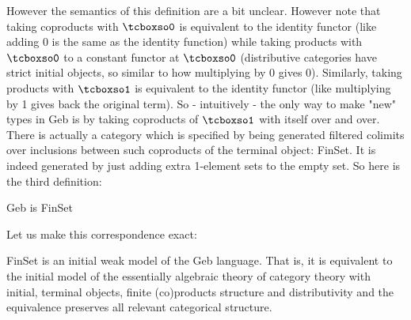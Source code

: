 However the semantics of this definition are a bit unclear. However note that taking coproducts with $\gebinit$ is equivalent to the identity functor (like adding 0 is the same as the identity function) while taking products with $\gebinit$ to a constant functor at $\gebinit$ (distributive categories have strict initial objects, so similar to how multiplying by 0 gives 0). Similarly, taking products with $\gebterm$ is equivalent to the identity functor (like multiplying by 1 gives back the original term). So - intuitively - the only way to make "new" types in Geb is by taking coproducts of $\gebterm$ with itself over and over. There is actually a category which is specified by being generated filtered colimits over inclusions between such coproducts of the terminal object: FinSet. It is indeed generated by just adding extra 1-element sets to the empty set. So here is the third definition:

\begin{definition}
Geb is FinSet
\end{definition}

Let us make this correspondence exact:

\begin{proposition}
FinSet is an initial weak model of the Geb language. That is, it is equivalent to the initial model of the essentially algebraic theory of category theory with initial, terminal objects, finite (co)products structure and distributivity and the equivalence preserves all relevant categorical structure.  
\end{proposition}


